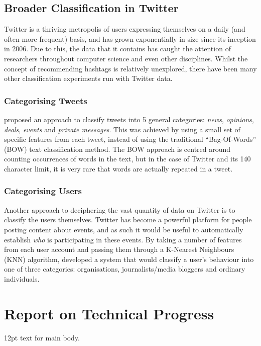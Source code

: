 \documentclass[12pt,a4paper]{article}
\begin{document}
\subsection{Broader Classification in Twitter}
Twitter is a thriving metropolis of users expressing themselves on a daily (and often more frequent) basis, and has grown exponentially in size since its inception in 2006. Due to this, the data that it contains has caught the attention of researchers throughout computer science and even other disciplines. Whilst the concept of recommending hashtags is relatively unexplored, there have been many other classification experiments run with Twitter data.

\subsubsection{Categorising Tweets}
\textcite{Sriram:2010} proposed an approach to classify tweets into 5 general categories: \emph{news}, \emph{opinions}, \emph{deals}, \emph{events} and \emph{private messages}. This was achieved by using a small set of specific features from each tweet, instead of using the traditional ``Bag-Of-Words'' (BOW) text classification method. The BOW approach is centred around counting occurrences of words in the text, but in the case of Twitter and its 140 character limit, it is very rare that words are actually repeated in a tweet.

\subsubsection{Categorising Users}
Another approach to deciphering the vast quantity of data on Twitter is to classify the users themselves. Twitter has become a powerful platform for people posting content about events, and as such it would be useful to automatically establish \emph{who} is participating in these events. By taking a number of features from each user account and passing them through a K-Nearest Neighbours (KNN) algorithm, \textcite{DeChoudhury:2012} developed a system that would classify a user's behaviour into one of three categories: organisations, journalists/media bloggers and ordinary individuals.

\pagebreak

\section{Report on Technical Progress}
12pt text for main body.
\pagebreak
\end{document}
